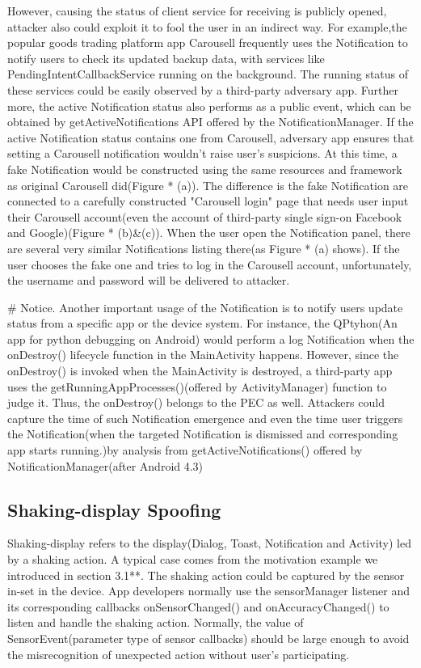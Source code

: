 \documentclass{sig-alternate-05-2015}
\begin{document}
However, causing the status of client service for receiving is publicly opened, attacker also could exploit it to fool the user in an indirect way. For example,the popular goods trading platform app Carousell frequently uses the Notification to notify users to check its updated backup data, with services like PendingIntentCallbackService running on the background. The running status of these services could be easily observed by a third-party adversary app.  Further more, the active Notification status also performs as a public event, which can be obtained by getActiveNotifications API offered by the NotificationManager. If the active Notification status contains one from Carousell, adversary app ensures that setting a Carousell notification wouldn't raise user's suspicions. At this time, a fake Notification would be constructed using the same resources and framework as original Carousell did(Figure * (a)). The difference is the fake Notification are connected to a carefully constructed "Carousell login" page that needs user input their Carousell account(even the account of third-party single sign-on Facebook and Google)(Figure * (b)\&(c)). When the user open the Notification panel, there are several very similar Notifications listing there(as Figure * (a) shows). If the user chooses the fake one and tries to log in the Carousell account, unfortunately, the username and password will be delivered to attacker.

\# Notice. Another important usage of the Notification is to notify users update status from a specific app or the device system. For instance, the QPtyhon(An app for python debugging on Android) would perform a log Notification when the onDestroy() lifecycle function in the MainActivity happens. However, since the onDestroy() is invoked when the MainActivity is destroyed, a third-party app uses the getRunningAppProcesses()(offered by ActivityManager) function to judge it. Thus, the onDestroy() belongs to the PEC as well. Attackers could capture the time of such Notification emergence and even the time user triggers the Notification(when the targeted Notification is dismissed and corresponding app starts running.)by analysis from getActiveNotifications() offered by NotificationManager(after Android 4.3) 


\subsection{Shaking-display Spoofing}
Shaking-display refers to the display(Dialog, Toast, Notification and Activity) led by a shaking action. A typical case comes from the motivation example we introduced in section 3.1**. The shaking action could be captured by the sensor in-set in the device. App developers normally use the sensorManager listener and its corresponding callbacks onSensorChanged() and onAccuracyChanged() to listen and handle the shaking action. Normally, the value of SensorEvent(parameter type of sensor callbacks) should be large enough to avoid the misrecognition of unexpected action without user's participating.
\end{document}
